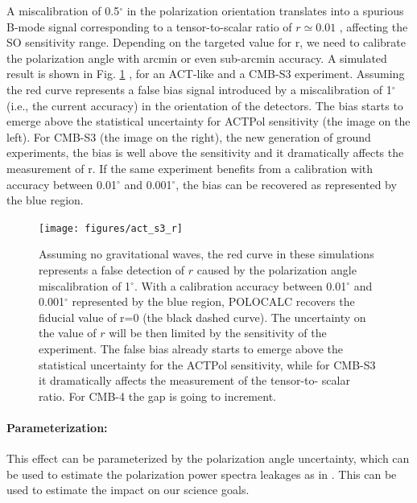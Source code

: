A miscalibration of 0.5$^{\circ}$ in the polarization orientation translates
into a spurious B-mode signal corresponding to a tensor-to-scalar ratio of $r
\simeq 0.01$ \cite{abitbol16}, affecting the SO sensitivity range.  Depending
on the targeted value for r, we need to calibrate the polarization angle with
arcmin or even sub-arcmin accuracy. 
A simulated result is shown in Fig. \ref{plot_r:fig} \cite{nati_2017}, for an
ACT-like and a CMB-S3 experiment. Assuming  the red curve represents a false
bias signal introduced by a miscalibration of 1$^{\circ}$ (i.e., the current
accuracy) in the orientation of the detectors.  The bias starts to emerge above
the statistical uncertainty for ACTPol sensitivity (the image on the left). For
CMB-S3 (the image on the right), the new generation of ground experiments, the
bias is well above the sensitivity and it dramatically affects the measurement
of r. If the same experiment benefits from a calibration with accuracy between
0.01$^{\circ}$ and 0.001$^{\circ}$, the bias can be recovered as represented by
the blue region.
 
\begin{figure}[ht]
\begin{center}
\texttt{[image: figures/act\_s3\_r]} 
\end{center}
\caption{Assuming no gravitational waves, the red curve in these simulations
represents a false detection of $r$ caused by the polarization angle
miscalibration of 1$^{\circ}$. With a calibration accuracy between
0.01$^{\circ}$ and 0.001$^{\circ}$ represented by the blue region, POLOCALC
\cite{nati_2017} recovers the fiducial value of r=0 (the black dashed curve).
The uncertainty on the value of $r$ will be then limited by the sensitivity of
the experiment. The false bias already starts to emerge above the statistical
uncertainty for the ACTPol sensitivity, while for CMB-S3 it dramatically
affects the measurement of the tensor-to- scalar ratio. For CMB-4 the gap is
going to increment.}
\label{plot_r:fig}
\end{figure}

\paragraph{Parameterization:}
This effect can be parameterized by the polarization angle uncertainty, which
can be used to estimate the polarization power spectra leakages as in
\cite{nati_2017}. This can be used to estimate the impact on our
science goals.
